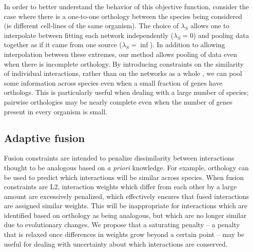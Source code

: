 \documentclass[11pt]{article}
\begin{document}
In order to better understand the behavior of this objective function, consider the case where there is a one-to-one orthology between the species being considered (ie different cell-lines of the same organism). The choice of $\lambda_S$ allows one to interpolate between fitting each network independently ($\lambda_S=0$) and pooling data together as if it came from one source ($\lambda_S=\inf$). In addition to allowing interpolation between these extremes, our method allows pooling of data even when there is incomplete orthology. By introducing constraints on the similarity of individual interactions, rather than on the networks as a whole \cite{liu2011temporal}, we can pool some information across species even when a small fraction of genes have orthologs. This is particularly useful when dealing with a large number of species; pairwise orthologies may be nearly complete even when the number of genes present in every organism is small. 


\subsection{Adaptive fusion}
Fusion constraints are intended to penalize dissimilarity between interactions thought to be analogous based on \textit{a priori} knowledge. For example, orthology can be used to predict which interactions will be similar across species. When fusion constraints are L2, interaction weights which differ from each other by a large amount are excessively penalized, which effectively ensures that fused interactions are assigned similar weights. This will be inappropriate for interactions which are identified based on orthology as being analogous, but which are no longer similar due to evolutionary changes. We propose that a saturating penalty -- a penalty that is relaxed once differences in weights grow beyond a certain point -- may be useful for dealing with uncertainty about which interactions are conserved. 
\end{document}

